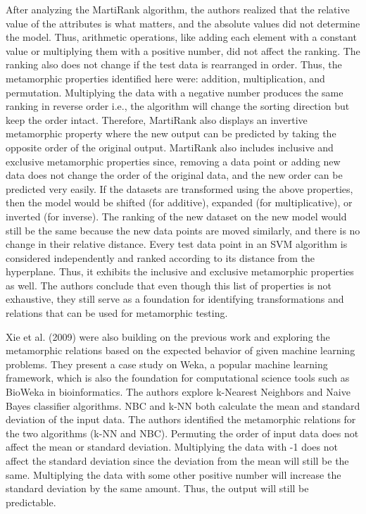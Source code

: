 After analyzing the MartiRank algorithm, the authors realized that the relative value of the attributes is what matters, and the absolute values did not determine the model. Thus, arithmetic operations, like adding each element with a constant value or multiplying them with a positive number, did not affect the ranking. The ranking also does not change if the test data is rearranged in order. Thus, the metamorphic properties identified here were: addition, multiplication, and permutation. Multiplying the data with a negative number produces the same ranking in reverse order i.e., the algorithm will change the sorting direction but keep the order intact. Therefore, MartiRank also displays an invertive metamorphic property where the new output can be predicted by taking the opposite order of the original output. MartiRank also includes inclusive and exclusive metamorphic properties since, removing a data point or adding new data does not change the order of the original data, and the new order can be predicted very easily. If the datasets are transformed using the above properties, then the model would be shifted (for additive), expanded (for multiplicative), or inverted (for inverse). The ranking of the new dataset on the new model would still be the same because the new data points are moved similarly, and there is no change in their relative distance. Every test data point in an SVM algorithm is considered independently and ranked according to its distance from the hyperplane. Thus, it exhibits the inclusive and exclusive metamorphic properties as well. The authors conclude that even though this list of properties is not exhaustive, they still serve as a foundation for identifying transformations and relations that can be used for metamorphic testing.


Xie et al. (2009) were also building on the previous work and exploring the metamorphic relations based on the expected behavior of given machine learning problems. They present a case study on Weka, a popular machine learning framework, which is also the foundation for computational science tools such as BioWeka in bioinformatics. The authors explore k-Nearest Neighbors and Naive Bayes classifier algorithms. NBC and k-NN both calculate the mean and standard deviation of the input data. The authors identified the metamorphic relations for the two algorithms (k-NN and NBC).
Permuting the order of input data does not affect the mean or standard deviation.
Multiplying the data with -1 does not affect the standard deviation since the deviation from the mean will still be the same.
Multiplying the data with some other positive number will increase the standard deviation by the same amount. Thus, the output will still be predictable.

